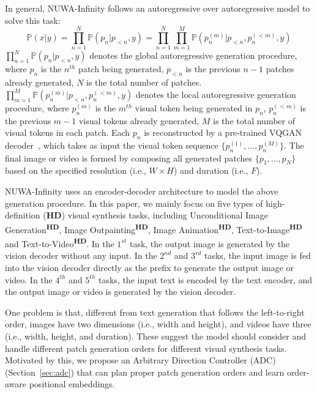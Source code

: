 \documentclass{article}
\begin{document}
In general, NUWA-Infinity follows an autoregressive over autoregressive model to solve this task:
\begin{equation}\label{eq:pxy}
    \mathbb{P}\left(x|y \right )=\prod_{n=1}^{N}\mathbb{P}\left (p_{n}|p_{<n},y\right)
    =\prod_{n=1}^{N}\prod_{m=1}^{M}\mathbb{P}\left ( p_{n}^{(m)}|p_{<n},p_{n}^{(<m)}, y\right )
\end{equation}
$\prod_{n=1}^{N}\mathbb{P}\left (p_{n}|p_{<n},y\right)$ denotes the global autoregressive generation procedure, where $p_n$ is the $n^{th}$ patch being generated, $p_{<n}$ is the previous $n-1$ patches already generated, $N$ is the total number of patches. $\prod_{m=1}^{M}\mathbb{P}\left (p_{n}^{(m)}|p_{<n},p_{n}^{(<m)}, y\right )$ denotes the local autoregressive generation procedure, where $p_{n}^{(m)}$ is the $m^{th}$ visual token being generated in $p_n$, $p_{n}^{(<m)}$ is the previous $m-1$ visual tokens already generated, $M$ is the total number of visual tokens in each patch. Each $p_n$ is reconstructed by a pre-trained VQGAN decoder~\cite{esserTamingTransformersHighResolution2021}, which takes as input the visual token sequence $\{p_n^{(1)},...,p_n^{(M)}\}$. The final image or video is formed by composing all generated patches $\{p_1,...,p_N\}$ based on the specified resolution (i.e., $W \times H$) and duration (i.e., $F$).

NUWA-Infinity uses an encoder-decoder architecture to model the above generation procedure. In this paper, we mainly focus on five types of high-definition (\textbf{HD}) visual synthesis tasks, including Unconditional Image Generation\textsuperscript{\textbf{HD}}, Image Outpainting\textsuperscript{\textbf{HD}}, Image Animation\textsuperscript{\textbf{HD}}, Text-to-Image\textsuperscript{\textbf{HD}} and Text-to-Video\textsuperscript{\textbf{HD}}. In the $1^{st}$ task, the output image is generated by the vision decoder without any input. In the $2^{nd}$ and $3^{rd}$ tasks, the input image is fed into the vision decoder directly as the prefix to generate the output image or video. In the $4^{th}$ and $5^{th}$ tasks, the input text is encoded by the text encoder, and the output image or video is generated by the vision decoder.

One problem is that, different from text generation that follows the left-to-right order, images have two dimensions (i.e., width and height), and videos have three (i.e., width, height, and duration). These suggest the model should consider and handle different patch generation orders for different visual synthesis tasks. Motivated by this, we propose an Arbitrary Direction Controller (ADC) (Section~\ref{sec:adc}) that can plan proper patch generation orders and learn order-aware positional embeddings.
\end{document}
